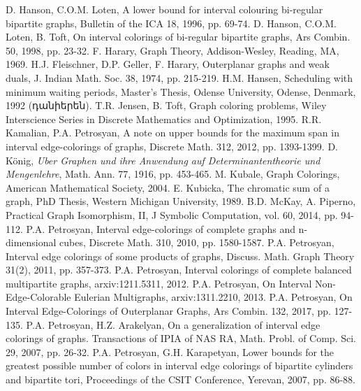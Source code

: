  D. Hanson, C.O.M. Loten, A lower bound for interval colouring bi-regular bipartite graphs, Bulletin of the ICA 18, 1996, pp. 69-74.
	D. Hanson, C.O.M. Loten, B. Toft, On interval colorings of bi-regular bipartite graphs, Ars Combin. 50, 1998, pp. 23-32.
 F. Harary, Graph Theory, Addison-Wesley, Reading, MA, 1969. 
 H.J. Fleischner, D.P. Geller, F. Harary, Outerplanar graphs and weak duals, J. Indian Math. Soc. 38, 1974, pp. 215-219.
 H.M. Hansen, Scheduling with minimum waiting periods, Master's Thesis, Odense University, Odense, Denmark, 1992 (դանիերեն).
 T.R. Jensen, B. Toft, Graph coloring problems, Wiley Interscience Series in Discrete Mathematics and Optimization, 1995.
	R.R. Kamalian, P.A. Petrosyan, A note on upper bounds for the maximum span in interval edge-colorings of graphs, Discrete Math. 312, 2012, pp. 1393-1399.
 D. König, \textit{Uber Graphen und ihre Anwendung auf Determinantentheorie und Mengenlehre}, Math. Ann. 77, 1916, pp. 453-465.
 M. Kubale, Graph Colorings, American Mathematical Society, 2004.
 E. Kubicka, The chromatic sum of a graph, PhD Thesis, Western Michigan University, 1989.
 B.D. McKay, A. Piperno, Practical Graph Isomorphism, II, J Symbolic Computation, vol. 60, 2014, pp. 94-112. %
	P.A. Petrosyan, Interval edge-colorings of complete graphs and n-dimensional cubes, Discrete Math. 310, 2010, pp. 1580-1587.
	P.A. Petrosyan, Interval edge colorings of some products of graphs, Discuss. Math. Graph Theory 31(2), 2011, pp. 357-373.
	P.A. Petrosyan, Interval colorings of complete balanced multipartite graphs, arxiv:1211.5311, 2012.
	P.A. Petrosyan, On Interval Non-Edge-Colorable Eulerian Multigraphs, arxiv:1311.2210, 2013.
 P.A. Petrosyan, On Interval Edge-Colorings of Outerplanar Graphs, Ars Combin. 132, 2017, pp. 127-135.
 P.A. Petrosyan, H.Z. Arakelyan, On a generalization of interval edge colorings of graphs. Transactions of IPIA of NAS RA, Math. Probl. of Comp. Sci. 29, 2007, pp. 26-32.
 P.A. Petrosyan, G.H. Karapetyan, Lower bounds for the greatest possible number of colors in interval edge colorings of bipartite cylinders and bipartite tori, Proceedings of the CSIT Conference, Yerevan, 2007, pp. 86-88.

